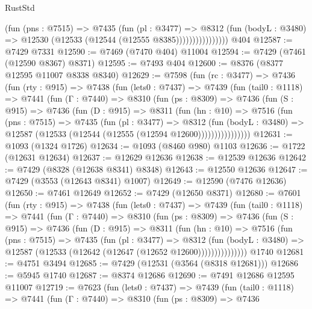 \begin{lexlean}{RustStd}
\begin{coremodule}
                        (fun (pns : @7515) =>
                        @7435
                          (fun (pl : @3477) =>
                          @8312
                            (fun (bodyL : @3480) =>
                            @12530 (@12533 (@12544 (@12555 @8385))))))))))))))))
    @404
@12587 := @7429 @7331
@12590 := @7469 (@7470 @404) @11004
@12594 := @7429 (@7461 (@12590 @8367) @8371)
@12595 := @7493 @404
@12600 := @8376 (@8377 @12595 @11007 @8338 @8340)
@12629 := @7598
    (fun (rc : @3477) =>
    @7436
      (fun (rty : @915) =>
      @7438
        (fun (lets0 : @7437) =>
        @7439
          (fun (tail0 : @1118) =>
          @7441
            (fun (Γ : @7440) =>
            @8310
              (fun (ps : @8309) =>
              @7436
                (fun (S : @915) =>
                @7436
                  (fun (D : @915) =>
                  @8311
                    (fun (hn : @10) =>
                    @7516
                      (fun (pns : @7515) =>
                      @7435
                        (fun (pl : @3477) =>
                        @8312
                          (fun (bodyL : @3480) =>
                          @12587 (@12533 (@12544 (@12555 (@12594 @12600))))))))))))))))
@12631 := @1093 (@1324 @1726)
@12634 := @1093 (@8460 @980) @1103
@12636 := @1722 (@12631 @12634)
@12637 := @12629 @12636
@12638 := @12539 @12636
@12642 := @7429 (@8328 (@12638 @8341) @8348)
@12643 := @12550 @12636
@12647 := @7429 (@3553 (@12643 @8341) @1007)
@12649 := @12590 (@7476 @12636)
@12650 := @7461 @12649
@12652 := @7429 (@12650 @8371)
@12680 := @7601
    (fun (rty : @915) =>
    @7438
      (fun (lets0 : @7437) =>
      @7439
        (fun (tail0 : @1118) =>
        @7441
          (fun (Γ : @7440) =>
          @8310
            (fun (ps : @8309) =>
            @7436
              (fun (S : @915) =>
              @7436
                (fun (D : @915) =>
                @8311
                  (fun (hn : @10) =>
                  @7516
                    (fun (pns : @7515) =>
                    @7435
                      (fun (pl : @3477) =>
                      @8312
                        (fun (bodyL : @3480) =>
                        @12587 (@12533 (@12642 (@12647 (@12652 @12600)))))))))))))))
    @1740
@12681 := @4751 @3494
@12685 := @7429 (@12531 (@3564 (@8318 @12681)))
@12686 := @5945 @1740
@12687 := @8374 @12686
@12690 := @7491 @12686 @12595 @11007
@12719 := @7623
    (fun (lets0 : @7437) =>
    @7439
      (fun (tail0 : @1118) =>
      @7441
        (fun (Γ : @7440) =>
        @8310
          (fun (ps : @8309) =>
          @7436

\end{coremodule}
\end{lexlean}
